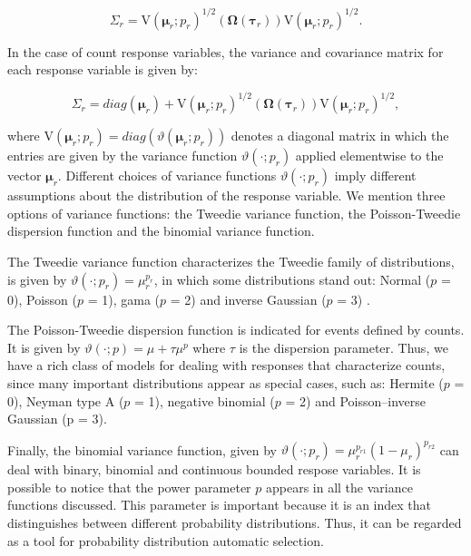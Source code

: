 \documentclass[article]{jss}\usepackage[]{graphicx}\usepackage[]{xcolor}
\begin{document}
$$
\Sigma_r =
\mathrm{V}\left(\boldsymbol{\mu}_r; p_r\right)^{1/2}(\boldsymbol{\Omega}\left(\boldsymbol{\tau}_r\right))\mathrm{V}\left(\boldsymbol{\mu}_r; p_r\right)^{1/2}.
$$

In the case of count response variables, the variance and covariance matrix for each response variable is given by:

$$
\Sigma_r = diag(\boldsymbol{\mu}_r)+ \mathrm{V}\left(\boldsymbol{\mu}_r; p_r\right)^{1/2}(\boldsymbol{\Omega}\left(\boldsymbol{\tau}_r\right))\mathrm{V}\left(\boldsymbol{\mu}_r; p_r\right)^{1/2},
$$

\noindent where $\mathrm{V}\left(\boldsymbol{\mu}_r; p_r\right) = diag(\vartheta(\boldsymbol{\mu}_r; p_r))$ denotes a diagonal matrix in which the entries are given by the variance function $\vartheta(\cdot; p_r)$ applied elementwise to the vector $\boldsymbol{\mu}_r$. Different choices of variance functions $\vartheta(\cdot; p_r)$ imply different assumptions about the distribution of the response variable. We mention three options of variance functions: the Tweedie variance function, the Poisson-Tweedie dispersion function and the binomial variance function.

The Tweedie variance function characterizes the Tweedie family of distributions, is given by $\vartheta\left(\cdot; p_r\right) = \mu^{p_r}_r$, in which some distributions stand out: Normal ($p$ = 0), Poisson ($p$ = 1), gama ($p$ = 2) and inverse Gaussian ($p$ = 3) \citep{Jorgensen87, Jorgensen97}. 

The Poisson-Tweedie dispersion function \citep{Jorgensen15} is indicated for events defined by counts. It is given by $\vartheta\left(\cdot; p\right) = \mu + \tau\mu^p$ where $\tau$ is the dispersion parameter. Thus, we have a rich class of models for dealing with responses that characterize counts, since many important distributions appear as special cases, such as: Hermite ($p$ = 0), Neyman type A ($p$ = 1), negative binomial ($p$ = 2) and Poisson–inverse Gaussian (p = $3$).

Finally, the binomial variance function, given by $\vartheta\left(\cdot; p_r\right) = \mu^{p_{r1}}_r(1 - \mu_r)^{p_{r2}}$ can deal with binary, binomial and continuous bounded respose variables.
It is possible to notice that the power parameter $p$ appears in all the variance functions discussed. This parameter is important because it is an index that distinguishes between different 
probability distributions. Thus, it can be regarded as a tool for probability distribution automatic selection.
\end{document}
